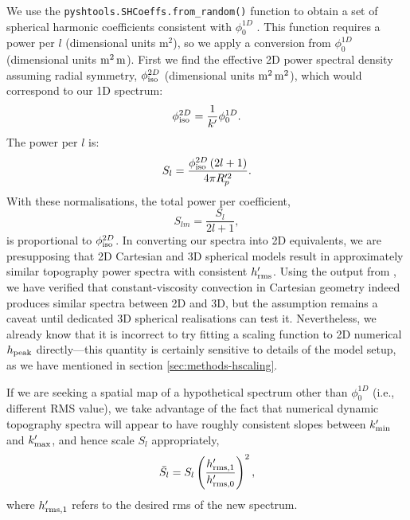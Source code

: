\documentclass[trackchanges]{aastex63}
\begin{document}
We use the {\tt pyshtools.SHCoeffs.from{\_}random()} function to obtain a set of spherical harmonic coefficients consistent with $\phi^{1D}_0$ \citep{wieczorek_shtools_2018}. This function requires a power per $l$ (dimensional units m$^2$), so we apply a conversion from $\phi^{1D}_0$ (dimensional units $\rm{m^2\,m}$). First we find the effective 2D power spectral density assuming radial symmetry, $\phi^{2D}_{\rm iso}$ (dimensional units $\rm{m^2\,m^2}$), which would correspond to our 1D spectrum:
\begin{equation}
\phi^{2D}_{\rm iso} = \frac{1}{k^\prime} \phi^{1D}_0.
\end{equation}
The power per $l$ is:
\begin{equation}
S_l = \frac{\phi^{2D}_{\rm iso} \left(2 l + 1\right)}{4 \pi R_p^{\prime 2}}.
\end{equation}
With these normalisations, the total power per coefficient,
\begin{equation}
S_{lm} = \frac{S_l}{2l + 1},
\end{equation}
is proportional to $\phi^{2D}_{\rm iso}$. In converting our spectra into 2D equivalents, we are presupposing that 2D Cartesian and 3D spherical models result in approximately similar topography power spectra with consistent $h_{\rm rms}^\prime$. Using the output from \citet{lees_gravity_2020}, we have verified that constant-viscosity convection in Cartesian geometry indeed produces similar spectra between 2D and 3D, but the assumption remains a caveat until dedicated 3D spherical realisations can test it. Nevertheless, we already know that it is incorrect to try fitting a scaling function to 2D numerical $h_{\rm peak}$ directly---this quantity is certainly sensitive to details of the model setup, as we have mentioned in section \ref{sec:methods-hscaling}.

If we are seeking a spatial map of a hypothetical spectrum other than $\phi^{1D}_0$ (i.e., different RMS value), we take advantage of the fact that numerical dynamic topography spectra will appear to have roughly consistent slopes between $k^\prime_{\rm min}$ and $k^\prime_{\rm max}$, and hence scale $S_l$ appropriately, 
\begin{equation}
\bar{S_l} = S_l \left(\frac{h^{\prime}_{{\rm rms}, 1}}{h^\prime_{{\rm rms}, 0}}\right)^2,
\end{equation}
where $h^{\prime}_{{\rm rms}, 1}$ refers to the desired rms of the new spectrum. 
\end{document}
